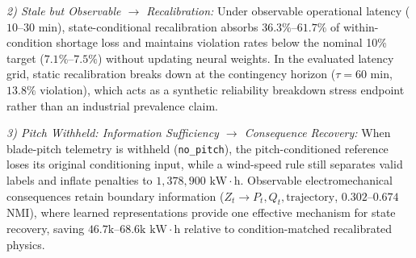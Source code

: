 \documentclass[
  journal]{IEEEtran}
\begin{document}
\textit{2) Stale but Observable $\to$ Recalibration:} Under observable
operational latency (\(10\text{--}30\text{ min}\)), state-conditional
recalibration absorbs \(36.3\%\)--\(61.7\%\) of within-condition
shortage loss and maintains violation rates below the nominal 10\%
target (\(7.1\%\text{--}7.5\%\)) without updating neural weights. In the
evaluated latency grid, static recalibration breaks down at the
contingency horizon (\(\tau = 60\text{ min}\), \(13.8\%\) violation),
which acts as a synthetic reliability breakdown stress endpoint rather
than an industrial prevalence claim.

\textit{3) Pitch Withheld: Information Sufficiency $\to$ Consequence Recovery:}
When blade-pitch telemetry is withheld (\texttt{no\_pitch}), the
pitch-conditioned reference loses its original conditioning input, while
a wind-speed rule still separates valid labels and inflate penalties to
\(1{,}378{,}900\text{ kW}\cdot\text{h}\). Observable electromechanical
consequences retain boundary information
(\(Z_t \to P_t, Q_t, \text{trajectory}\), \(0.302\text{--}0.674\) NMI),
where learned representations provide one effective mechanism for state
recovery, saving \(46.7\text{k}\text{--}68.6\text{k kW}\cdot\text{h}\)
relative to condition-matched recalibrated physics.
\end{document}

